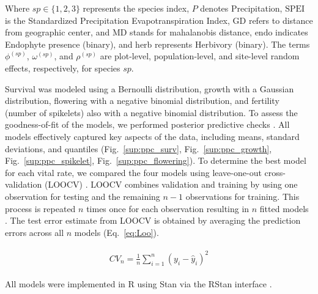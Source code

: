 \documentclass[12pt]{article}\usepackage[]{graphicx}\usepackage[dvipsnames]{xcolor}
\begin{document}
\noindent Where \( sp \in \{1, 2, 3\} \) represents the species index, \( P \) denotes Precipitation, \( \text{SPEI} \) is the Standardized Precipitation Evapotranspiration Index, \( \text{GD} \) refers to distance from geographic center, and \( \text{MD} \) stands for mahalanobis distance, \( \text{endo} \) indicates Endophyte presence (binary), and \( \text{herb} \) represents Herbivory (binary). The terms \( \phi^{(sp)} \), \( \omega^{(sp)} \), and \( \rho^{(sp)} \) are plot-level, population-level, and site-level random effects, respectively, for species \( sp \).

Survival was modeled using a Bernoulli distribution, growth with a Gaussian distribution, flowering with a negative binomial distribution, and fertility (number of spikelets) also with a negative binomial distribution.
To assess the goodness-of-fit of the models, we performed posterior predictive checks \citep{gelman2000diagnostic, berkhof2000posterior}.  
All models effectively captured key aspects of the data, including means, standard deviations, and quantiles (Fig.~\ref{sup:ppc_surv}, Fig.~\ref{sup:ppc_growth}, Fig.~\ref{sup:ppc_spikelet}, Fig.~\ref{sup:ppc_flowering}).
To determine the best model for each vital rate, we compared the four models using leave-one-out cross-validation (LOOCV) \citep{vehtari2017practical}.  
LOOCV combines validation and training by using one observation for testing and the remaining $n-1$ observations for training.  
This process is repeated $n$ times once for each observation resulting in $n$ fitted models \citep{silva2024robust}.  
The test error estimate from LOOCV is obtained by averaging the prediction errors across all $n$ models (Eq.~\ref{eq:Loo}).

\begin{align}\label{eq:Loo}
\begin{split}
CV_{n} = \frac{1}{n} \sum_{i=1}^{n} (y_{i} - \hat{y}_{i})^2
\end{split}
\end{align}

All models were implemented in R \citep{RCoreTeam} using Stan via the RStan interface \citep{Rstan}.



\end{document}
